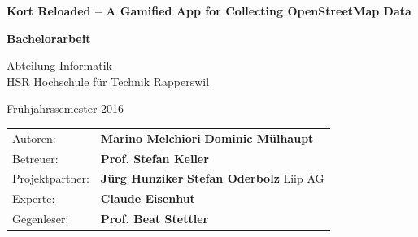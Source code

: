 \begin{titlepage}

\begin{figure}[H]
\hfill
{}
\end{figure}

\vspace{2cm}

\begin{center}
{ \Large
	\textbf{Kort Reloaded -- A Gamified App for Collecting OpenStreetMap Data}
	\vspace{1cm}

	\textbf{Bachelorarbeit}
	\vspace{1cm}

	Abteilung Informatik \\[0.2cm]
	HSR Hochschule für Technik Rapperswil
	\vspace{1cm}

	Frühjahrssemester 2016
}
\end{center}
\vspace{1cm}


\begin{table}[H] 
\centering 
\begin{tabular}{p{0.19\twocelltabwidth}p{0.4\twocelltabwidth}}
Autoren: & \textbf{Marino Melchiori} \newline
\textbf{Dominic Mülhaupt} \\ 
Betreuer: & \textbf{Prof. Stefan Keller} \\ 
Projektpartner: & \textbf{Jürg Hunziker} \newline
\textbf{Stefan Oderbolz} \newline
Liip AG\\ 
Experte: & \textbf{Claude Eisenhut} \\ 
Gegenleser: & \textbf{Prof. Beat Stettler} \\ 
\end{tabular}
\end{table}

\end{titlepage}